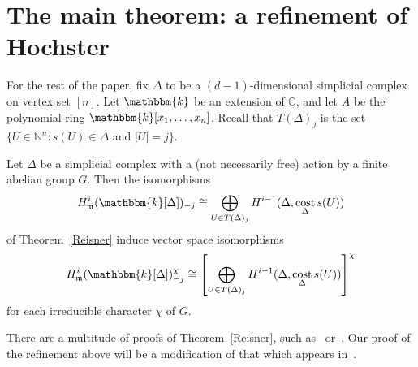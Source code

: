 \documentclass[ALCO,ThmDefs,Unicode]{cedram}
\DeclareMathOperator\cost{cost}
\newcommand{\field}{\mathbbm{k}}
\newcommand{\NN}{{\mathbb N}}
\newcommand{\CC}{{\mathbb C}}
\newcommand{\mideal}{\ensuremath{\mathfrak{m}}}
\begin{document}
\section{The main theorem: a refinement of Hochster}\label{ReisnerSection}

For the rest of the paper, fix $\Delta$ to be a $(d-1)$-dimensional simplicial complex on vertex set $[n]$. Let $\field$ be an extension of $\CC$, and let $A$ be the polynomial ring $\field[x_1, \ldots, x_n]$. Recall that $T(\Delta)_j$ is the set $\{U\in \NN^n: s(U)\in \Delta$ and $ |U|=j\}$.

\begin{theo}\label{ReisnerAnalog}
Let $\Delta$ be a simplicial complex with a (not necessarily free) action by a finite abelian group $G$. Then the isomorphisms
\[
H_\mideal^i(\field[\Delta])_{-j}\cong \bigoplus_{U\in T(\Delta)_j}H^{i-1}(\Delta, \cost_\Delta s(U))
\]
of Theorem~\ref{Reisner} induce vector space isomorphisms
\[
H_\mideal^i(\field[\Delta])_{-j}^\chi\cong \left[\bigoplus_{U\in T(\Delta)_j}H^{i-1}(\Delta, \cost_\Delta s(U))\right]^{\chi}
\]
for each irreducible character $\chi$ of $G$.
\end{theo}

\begin{rema}
There are a multitude of proofs of Theorem~\ref{Reisner}, such as~\cite[Theorem~1]{Grabe} or~\cite[Corollary~4.4]{canonicalMap}. Our proof of the refinement above will be a modification of that which appears in~\cite{characterizations}.
\end{rema}
\end{document}
